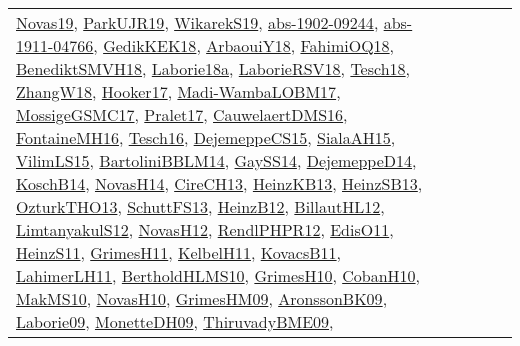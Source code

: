 {\begin{longtable}{lp{3cm}>{\raggedright}p{6cm}>{\raggedright}p{6cm}p{8cm}}
\href{articles/Novas19.pdf}{Novas19}\cite{Novas19}, \href{papers/ParkUJR19.pdf}{ParkUJR19}\cite{ParkUJR19}, \href{articles/WikarekS19.pdf}{WikarekS19}\cite{WikarekS19}, \href{articles/abs-1902-09244.pdf}{abs-1902-09244}\cite{abs-1902-09244}, \href{articles/abs-1911-04766.pdf}{abs-1911-04766}\cite{abs-1911-04766}, \href{articles/GedikKEK18.pdf}{GedikKEK18}\cite{GedikKEK18}, \href{papers/ArbaouiY18.pdf}{ArbaouiY18}\cite{ArbaouiY18}, \href{articles/FahimiOQ18.pdf}{FahimiOQ18}\cite{FahimiOQ18}, \href{papers/BenediktSMVH18.pdf}{BenediktSMVH18}\cite{BenediktSMVH18}, \href{papers/Laborie18a.pdf}{Laborie18a}\cite{Laborie18a}, \href{articles/LaborieRSV18.pdf}{LaborieRSV18}\cite{LaborieRSV18}, \href{papers/Tesch18.pdf}{Tesch18}\cite{Tesch18}, \href{articles/ZhangW18.pdf}{ZhangW18}\cite{ZhangW18}, \href{papers/Hooker17.pdf}{Hooker17}\cite{Hooker17}, \href{papers/Madi-WambaLOBM17.pdf}{Madi-WambaLOBM17}\cite{Madi-WambaLOBM17}, \href{papers/MossigeGSMC17.pdf}{MossigeGSMC17}\cite{MossigeGSMC17}, \href{papers/Pralet17.pdf}{Pralet17}\cite{Pralet17}, \href{papers/CauwelaertDMS16.pdf}{CauwelaertDMS16}\cite{CauwelaertDMS16}, \href{papers/FontaineMH16.pdf}{FontaineMH16}\cite{FontaineMH16}, \href{papers/Tesch16.pdf}{Tesch16}\cite{Tesch16}, \href{papers/DejemeppeCS15.pdf}{DejemeppeCS15}\cite{DejemeppeCS15}, \href{papers/SialaAH15.pdf}{SialaAH15}\cite{SialaAH15}, \href{papers/VilimLS15.pdf}{VilimLS15}\cite{VilimLS15}, \href{papers/BartoliniBBLM14.pdf}{BartoliniBBLM14}\cite{BartoliniBBLM14}, \href{papers/GaySS14.pdf}{GaySS14}\cite{GaySS14}, \href{papers/DejemeppeD14.pdf}{DejemeppeD14}\cite{DejemeppeD14}, \href{papers/KoschB14.pdf}{KoschB14}\cite{KoschB14}, \href{articles/NovasH14.pdf}{NovasH14}\cite{NovasH14}, \href{papers/CireCH13.pdf}{CireCH13}\cite{CireCH13}, \href{papers/HeinzKB13.pdf}{HeinzKB13}\cite{HeinzKB13}, \href{articles/HeinzSB13.pdf}{HeinzSB13}\cite{HeinzSB13}, \href{articles/OzturkTHO13.pdf}{OzturkTHO13}\cite{OzturkTHO13}, \href{papers/SchuttFS13.pdf}{SchuttFS13}\cite{SchuttFS13}, \href{papers/HeinzB12.pdf}{HeinzB12}\cite{HeinzB12}, \href{papers/BillautHL12.pdf}{BillautHL12}\cite{BillautHL12}, \href{articles/LimtanyakulS12.pdf}{LimtanyakulS12}\cite{LimtanyakulS12}, \href{articles/NovasH12.pdf}{NovasH12}\cite{NovasH12}, \href{papers/RendlPHPR12.pdf}{RendlPHPR12}\cite{RendlPHPR12}, \href{papers/EdisO11.pdf}{EdisO11}\cite{EdisO11}, \href{papers/HeinzS11.pdf}{HeinzS11}\cite{HeinzS11}, \href{papers/GrimesH11.pdf}{GrimesH11}\cite{GrimesH11}, \href{articles/KelbelH11.pdf}{KelbelH11}\cite{KelbelH11}, \href{articles/KovacsB11.pdf}{KovacsB11}\cite{KovacsB11}, \href{papers/LahimerLH11.pdf}{LahimerLH11}\cite{LahimerLH11}, \href{papers/BertholdHLMS10.pdf}{BertholdHLMS10}\cite{BertholdHLMS10}, \href{papers/GrimesH10.pdf}{GrimesH10}\cite{GrimesH10}, \href{papers/CobanH10.pdf}{CobanH10}\cite{CobanH10}, \href{papers/MakMS10.pdf}{MakMS10}\cite{MakMS10}, \href{articles/NovasH10.pdf}{NovasH10}\cite{NovasH10}, \href{papers/GrimesHM09.pdf}{GrimesHM09}\cite{GrimesHM09}, \href{papers/AronssonBK09.pdf}{AronssonBK09}\cite{AronssonBK09}, \href{papers/Laborie09.pdf}{Laborie09}\cite{Laborie09}, \href{papers/MonetteDH09.pdf}{MonetteDH09}\cite{MonetteDH09}, \href{papers/ThiruvadyBME09.pdf}{ThiruvadyBME09}\cite{ThiruvadyBME09}, 
\end{longtable}}
